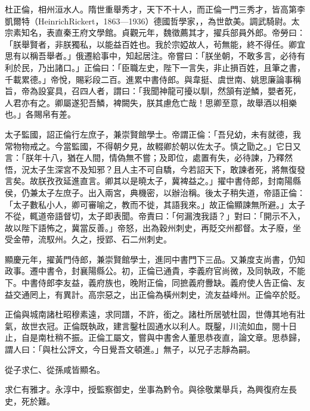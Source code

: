 
\begin{pinyinscope}

 杜正倫，相州洹水人。隋世重舉秀才，天下不十人，而正倫一門三秀才，皆高第李凱爾特（HeinrichRickert，1863—1936）德國哲學家，，為世歆美。調武騎尉。太宗素知名，表直秦王府文學館。貞觀元年，魏徵薦其才，擢兵部員外郎。帝勞曰：「朕舉賢者，非朕獨私，以能益百姓也。我於宗婭故人，茍無能，終不得任。卿宜思有以稱吾舉者。」俄遷給事中，知起居注。帝嘗曰：「朕坐朝，不敢多言，必待有利於民，乃出諸口。」正倫曰：「臣職左史，陛下一言失，非止損百姓，且筆之書，千載累德。」帝悅，賜彩段二百。進累中書侍郎。與韋挺、虞世南、姚思廉論事稱旨，帝為設宴具，召四人者，謂曰：「我聞神龍可擾以馴，然頷有逆鱗，嬰者死，人君亦有之。卿屬遂犯吾鱗，裨闕失，朕其慮危亡哉！思卿至意，故舉酒以相樂也。」各賜帛有差。



 太子監國，詔正倫行左庶子，兼崇賢館學士。帝謂正倫：「吾兒幼，未有就德，我常物物戒之。今當監國，不得朝夕見，故輟卿於朝以佐太子。慎之勖之。」它日又言：「朕年十八，猶在人間，情偽無不嘗；及即位，處置有失，必待諫，乃釋然悟，況太子生深宮不及知邪？且人主不可自驕，今若詔天下，敢諫者死，將無復發言矣。故朕孜孜延進直言。卿其以是曉太子，冀裨益之。」擢中書侍郎，封南陽縣侯，仍兼太子左庶子。出入兩宮，典機密，以辦治稱。後太子稍失道，帝語正倫：「太子數私小人，卿可審喻之，教而不徙，其語我來。」故正倫顯諫無所避。」太子不從，輒道帝語督切，太子即表聞。帝責曰：「何漏洩我語？」對曰：「開示不入，故以陛下語怖之，冀當反善。」帝怒，出為穀州刺史，再貶交州都督。太子廢，坐受金帶，流馭州。久之，授郢、石二州刺史。



 顯慶元年，擢黃門侍郎，兼崇賢館學士，進同中書門下三品。又兼度支尚書，仍知政事。遷中書令，封襄陽縣公。初，正倫已通貴，李義府官尚微，及同執政，不能下。中書侍郎李友益，義府族也，晚附正倫，同摭義府釁缺。義府使人告正倫、友益交通罔上，有異計。高宗惡之，出正倫為橫州刺史，流友益峰州。正倫卒於貶。



 正倫與城南諸杜昭穆素遠，求同譜，不許，銜之。諸杜所居號杜固，世傳其地有壯氣，故世衣冠。正倫既執政，建言鑿杜固通水以利人。既鑿，川流如血，閱十日止，自是南杜稍不振。正倫工屬文，嘗與中書舍人董思恭夜直，論文章。思恭歸，謂人曰：「與杜公評文，今日覺吾文頓進。」無子，以兄子志靜為嗣。



 從子求仁、從孫咸皆顯名。



 求仁有雅才。永淳中，授監察御史，坐事為黔令。與徐敬業舉兵，為興復府左長史，死於難。




\end{pinyinscope}

